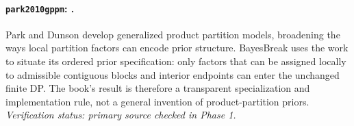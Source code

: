 
\paragraph{\texttt{park2010gppm}: \citet{park2010gppm}.}
Park and Dunson develop generalized product partition models, broadening the ways local partition factors can encode prior structure. BayesBreak uses the work to situate its ordered prior specification: only factors that can be assigned locally to admissible contiguous blocks and interior endpoints can enter the unchanged finite DP. The book's result is therefore a transparent specialization and implementation rule, not a general invention of product-partition priors. \textit{Verification status: primary source checked in Phase 1.}
